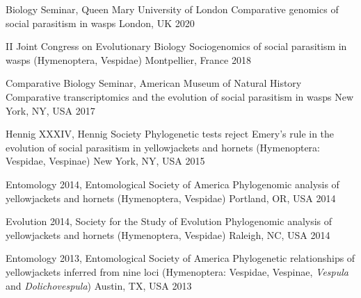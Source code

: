 {\color{awesome}\faMicrophone*}


\begin{cventries}

  \cventry
    {Biology Seminar, Queen Mary University of London} %
    {Comparative genomics of social parasitism in wasps} %
    {London, UK} %
    {2020} %
    {}

  \cventry
    {II Joint Congress on Evolutionary Biology} %
    {Sociogenomics of social parasitism in wasps (Hymenoptera, Vespidae)} %
    {Montpellier, France} %
    {2018} %
    {}

  \cventry
    {Comparative Biology Seminar, American Museum of Natural History} %
    {Comparative transcriptomics and the evolution of social parasitism in wasps} %
    {New York, NY, USA} %
    {2017} %
    {}

  \cventry
    {Hennig XXXIV, Hennig Society} %
    {Phylogenetic tests reject Emery’s rule in the evolution of social parasitism
    in yellowjackets and hornets (Hymenoptera: Vespidae, Vespinae)} %
    {New York, NY, USA} %
    {2015} %
    {}

  \cventry
    {Entomology 2014, Entomological Society of America} %
    {Phylogenomic analysis of yellowjackets and hornets (Hymenoptera, Vespidae)} %
    {Portland, OR, USA} %
    {2014} %
    {}

  \cventry
    {Evolution 2014, Society for the Study of Evolution} %
    {Phylogenomic analysis of yellowjackets and hornets (Hymenoptera, Vespidae)} %
    {Raleigh, NC, USA} %
    {2014} %
    {}

  \cventry
    {Entomology 2013, Entomological Society of America} %
    {Phylogenetic relationships of yellowjackets inferred from nine loci
    (Hymenoptera: Vespidae, Vespinae, \textit{Vespula} and 
    \textit{Dolichovespula})} %
    {Austin, TX, USA} %
    {2013} %
    {}


\end{cventries}
